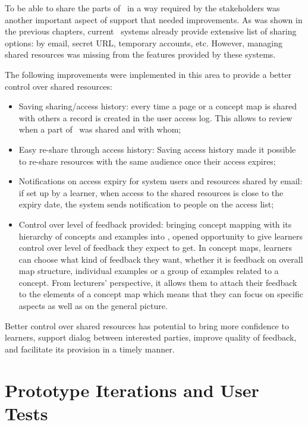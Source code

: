 To be able to share the parts of \ep~in a way required by the stakeholders was
another important aspect of \LLLs support that needed improvements. As was shown
in the previous chapters, current \ep~systems already provide extensive list of
sharing options: by email, secret URL, temporary accounts, etc. However,
managing shared resources was missing from the features provided by these systems.

The following improvements were implemented in this area to provide a better
control over shared resources:

\begin{itemize}
  \item Saving sharing/access history: every time a page or a concept map is
  shared with others a record is created in the user access log. This allows to
  review when a part of \ep~was shared and with whom; 
  \item Easy re-share through access history: Saving access history made it
  possible to re-share resources with the same audience once their access
  expires;
  \item Notifications on access expiry for system users and resources shared by
  email: if set up by a learner, when access to the shared resources is close to
  the expiry date, the system sends notification to people on the access list;
  \item Control over level of feedback provided: bringing concept mapping with
  its hierarchy of concepts and examples into \ep, opened opportunity to give
  learners control over level of feedback they expect to get. In concept maps,
  learners can choose what kind of feedback they want, whether it is feedback on
  overall map structure, individual examples or a group of examples related to a
  concept. From lecturers' perspective, it allows them to attach their feedback
  to the elements of a concept map which means that they can focus on specific
  aspects as well as on the general picture.
\end{itemize}

Better control over shared resources has potential to bring more confidence to
learners, support dialog between interested parties, improve quality of
feedback, and facilitate its provision in a timely manner.

\section{Prototype Iterations and User Tests}
 
